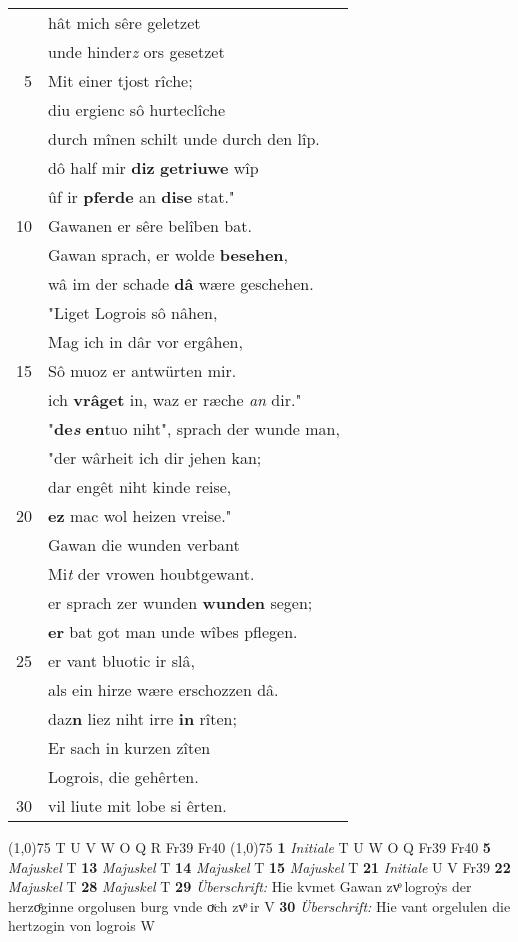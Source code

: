 \documentclass[8pt,a4paper,notitlepage]{article}
\begin{document}
\begin{table}[ht]
\begin{minipage}[t]{0.5\linewidth}
\begin{tabular}{rl}
 & hât mich sêre geletzet\\ 
 & unde hinder\textit{z} ors gesetzet\\ 
5 & Mit einer tjost rîche;\\ 
 & diu ergienc sô hurteclîche\\ 
 & durch mînen schilt unde durch den lîp.\\ 
 & dô half mir \textbf{diz} \textbf{getriuwe} wîp\\ 
 & ûf ir \textbf{pferde} an \textbf{dise} stat."\\ 
10 & Gawanen er sêre belîben bat.\\ 
 & Gawan sprach, er wolde \textbf{besehen},\\ 
 & wâ im der schade \textbf{dâ} wære geschehen.\\ 
 & "Liget Logrois sô nâhen,\\ 
 & Mag ich in dâr vor ergâhen,\\ 
15 & Sô muoz er antwürten mir.\\ 
 & ich \textbf{vrâget} in, waz er ræche \textit{an} dir."\\ 
 & "\textbf{de\textit{s}} \textbf{en}tuo niht", sprach der wunde man,\\ 
 & "der wârheit ich dir jehen kan;\\ 
 & dar engêt niht kinde reise,\\ 
20 & \textbf{ez} mac wol heizen vreise."\\ 
 & Gawan die wunden verbant\\ 
 & Mi\textit{t} der vrowen houbtgewant.\\ 
 & er sprach zer wunden \textbf{wunden} segen;\\ 
 & \textbf{er} bat got man unde wîbes pflegen.\\ 
25 & er vant bluotic ir slâ,\\ 
 & als ein hirze wære erschozzen dâ.\\ 
 & daz\textbf{n} liez niht irre \textbf{in} rîten;\\ 
 & Er sach in kurzen zîten\\ 
 & Logrois, die gehêrten.\\ 
30 & vil liute mit lobe si êrten.\\ 
\end{tabular}
\scriptsize
\line(1,0){75} \newline
T U V W O Q R Fr39 Fr40 \newline
\line(1,0){75} \newline
\textbf{1} \textit{Initiale} T U W O Q Fr39 Fr40  \textbf{5} \textit{Majuskel} T  \textbf{13} \textit{Majuskel} T  \textbf{14} \textit{Majuskel} T  \textbf{15} \textit{Majuskel} T  \textbf{21} \textit{Initiale} U V Fr39  \textbf{22} \textit{Majuskel} T  \textbf{28} \textit{Majuskel} T  \textbf{29} \textit{Überschrift:} Hie kvmet Gawan zvͦ logroẏs der herzoͤginne orgolusen burg vnde oͮch zvͦ ir V  \textbf{30} \textit{Überschrift:} Hie vant orgelulen die hertzogin von logrois W  \newline

\end{minipage}
\end{table}
\end{document}
